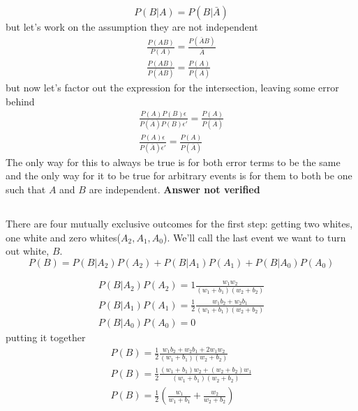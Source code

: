 \subsection{}
\begin{equation}
	P(B|A) = P(B | \bar{A}) 
\end{equation}
but let's work on the assumption they are not independent
\begin{eqnarray*}
	\frac{P(AB)}{P(A)} = \frac{P(\bar{A}B)}{\bar{A}} \\
	\frac{P(AB)}{P(\bar{A}B)} = \frac{P(A)}{P(\bar{A})}
\end{eqnarray*}
but now let's factor out the expression for the intersection, leaving some error behind
\begin{eqnarray*}
	\frac{P(A)P(B)\epsilon}{P(\bar{A})P(B)\epsilon{}'} = \frac{P(A)}{P(\bar{A})} \\	
	\frac{P(A)\epsilon}{P(\bar{A})\epsilon{}'} = \frac{P(A)}{P(\bar{A})}
\end{eqnarray*}
The only way for this to always be true is for both error terms to be the same and the only way for it to be true for arbitrary events is for them to both be one such that $A$ and $B$ are independent.
\textbf{Answer not verified}

\subsection{}
There are four mutually exclusive outcomes for the first step: getting two whites, one white and zero whites($A_2, A_1, A_0$).  We'll call the last event we want to turn out white, $B$.
\begin{equation}
	P(B) = P(B|A_2)P(A_2) + P(B|A_1)P(A_1) + P(B|A_0)P(A_0)
\end{equation}

\begin{eqnarray}
	P(B|A_2)P(A_2) =  1 \frac{w_1 w_2}{(w_1 + b_1)(w_2 + b_2)}\\
	P(B|A_1)P(A_1) = \frac{1}{2} \frac{w_1 b_2 + w_2 b_1}{(w_1 + b_1)(w_2 + b_2)} \\
	P(B|A_0)P(A_0) = 0
\end{eqnarray}
putting it together
\begin{eqnarray}
	P(B) = \frac{1}{2} \frac{w_1 b_2 + w_2 b_1 + 2 w_1 w_2}{(w_1 + b_1)(w_2 + b_2)}  \\
	P(B) = \frac{1}{2} \frac{(w_1 +b_1 )w_2 + (w_2 + b_2) w_1 }{(w_1 + b_1)(w_2 + b_2)}  \\
	P(B) = \frac{1}{2} \left( \frac{w_1}{w_1+b_1} + \frac{w_2}{w_2+b_2} \right)
\end{eqnarray}

